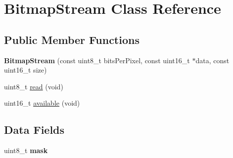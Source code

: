 \hypertarget{class_bitmap_stream}{\section{Bitmap\-Stream Class Reference}
\label{class_bitmap_stream}
}
\subsection*{Public Member Functions}
\begin{DoxyCompactItemize}
\item 
\hypertarget{class_bitmap_stream_ae6a3aa8f263e5b2a3c0dfd219799fa3f}{{\bfseries Bitmap\-Stream} (const uint8\-\_\-t bits\-Per\-Pixel, const uint16\-\_\-t $\ast$data, const uint16\-\_\-t size)}\label{class_bitmap_stream_ae6a3aa8f263e5b2a3c0dfd219799fa3f}

\item 
uint8\-\_\-t \hyperlink{class_bitmap_stream_a874c025bb9117ed099f4d17fdd0d8748}{read} (void)
\item 
uint16\-\_\-t \hyperlink{class_bitmap_stream_a7c43b1250447cf169c5c51eb49634676}{available} (void)
\end{DoxyCompactItemize}
\subsection*{Data Fields}
\begin{DoxyCompactItemize}
\item 
\hypertarget{class_bitmap_stream_a8a74907784be6c7786c2d060c8d7e10b}{uint8\-\_\-t {\bfseries mask}}\label{class_bitmap_stream_a8a74907784be6c7786c2d060c8d7e10b}

\end{DoxyCompactItemize}


